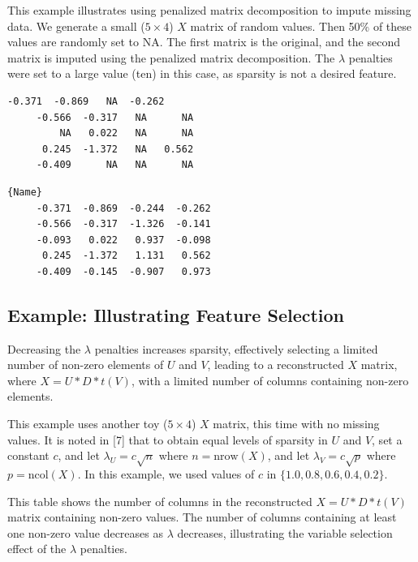 \documentclass{article}
\begin{document}
This example illustrates using penalized matrix decomposition to impute missing data.  We generate a small ($5\times4$) $X$ matrix of random values.  Then 50\% of these values are randomly set to NA.  The first matrix is the original, and the second matrix is imputed using the penalized matrix decomposition.  The $\lambda$ penalties were set to a large value (ten) in this case, as sparsity is not a desired feature.

\noindent\begin{minipage}{.48\textwidth}
\begin{lstlisting}[caption=Original Matrix,frame=tlrb,basicstyle=\tiny]
     -0.371  -0.869   NA  -0.262
     -0.566  -0.317   NA      NA
         NA   0.022   NA      NA
      0.245  -1.372   NA   0.562
     -0.409      NA   NA      NA
\end{lstlisting}
\end{minipage}\hfill
\begin{minipage}{.48\textwidth}
\begin{lstlisting}[caption=Imputed Matrix,frame=tlrb,basicstyle=\tiny]{Name}
     -0.371  -0.869  -0.244  -0.262
     -0.566  -0.317  -1.326  -0.141
     -0.093   0.022   0.937  -0.098
      0.245  -1.372   1.131   0.562
     -0.409  -0.145  -0.907   0.973
\end{lstlisting}
\end{minipage}

\subsection{Example: Illustrating Feature Selection}

Decreasing the $\lambda$ penalties increases sparsity, effectively selecting a limited number of non-zero elements of $U$ and $V$, leading to a reconstructed $X$ matrix, where $X = U*D*t(V)$, with a limited number of columns containing non-zero elements.

This example uses another toy ($5\times4$) $X$ matrix, this time with no missing values.  It is noted in [7] that to obtain equal levels of sparsity in $U$ and $V$, set a constant $c$, and let $\lambda_U = c\sqrt{n}$ where $n = \text{nrow}(X)$, and let $\lambda_V = c\sqrt{p}$ where $p = \text{ncol}(X)$.  In this example, we used values of $c$ in $\{1.0, 0.8, 0.6, 0.4, 0.2\}$.

This table shows the number of columns in the reconstructed $X = U*D*t(V)$ matrix containing non-zero values.  The number of columns containing at least one non-zero value decreases as $\lambda$ decreases, illustrating the variable selection effect of the $\lambda$ penalties.
\end{document}
